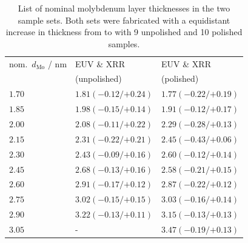 \begin{table}[htbp]
\centering
\caption{List of nominal molybdenum layer thicknesses in the two sample sets. Both sets were fabricated with a equidistant increase in thickness from  to  with 9 unpolished and 10 polished samples.}
\label{ch_spec:tbl_mo_si_thickness_mcmc_result}
\begin{tabular}{@{}lll@{}}
\toprule
nom.~$d_\text{Mo}$ / nm & EUV \& XRR &EUV \& XRR\\ 
&(unpolished) & (polished) \\
\midrule
$1.70$ &$1.81({-0.12}/{+0.24})$  &$1.77({-0.22}/{+0.19})$ \\
$1.85$ &$1.98({-0.15}/{+0.14})$  &$1.91({-0.12}/{+0.17})$ \\
$2.00$ &$2.08({-0.11}/{+0.22})$  &$2.29({-0.28}/{+0.13})$ \\
$2.15$ &$2.31({-0.22}/{+0.21})$  &$2.45({-0.43}/{+0.06})$ \\
$2.30$ &$2.43({-0.09}/{+0.16})$   &$2.60({-0.12}/{+0.14})$ \\
$2.45$ &$2.68({-0.13}/{+0.16})$  &$2.58({-0.21}/{+0.15})$ \\
$2.60$ &$2.91({-0.17}/{+0.12})$ &$2.87({-0.22}/{+0.12})$ \\
$2.75$ &$3.02({-0.15}/{+0.15})$  &$3.03({-0.16}/{+0.14})$ \\
$2.90$ &$3.22({-0.13}/{+0.11})$ &$3.15({-0.13}/{+0.13})$ \\
$3.05$ &-  & $3.47({-0.19}/{+0.13})$ \\
 \bottomrule
\end{tabular}
\end{table}

